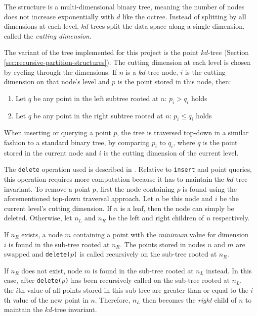The structure is a multi-dimensional binary tree, meaning the number of nodes does not increase exponentially with $d$ like the octree. Instead of splitting by all dimensions at each level, $kd$-trees split the data space along a single dimension, called the \textit{cutting dimension}.

The variant of the tree implemented for this project is the point $kd$-tree (Section \ref{sec:recursive-partition-structures}). The cutting dimension at each level is chosen by cycling through the dimensions. If $n$ is a $kd$-tree node, $i$ is the cutting dimension on that node's level and $p$ is the point stored in this node, then:
\begin{enumerate}
	\item Let $q$ be any point in the left subtree rooted at $n$: $p_i > q_i$ holds
	\item Let $q$ be any point in the right subtree rooted at $n$: $p_i \leq q_i$ holds
\end{enumerate}
When inserting or querying a point $p$, the tree is traversed top-down in a similar fashion to a standard binary tree, by comparing $p_i$ to $q_i$, where $q$ is the point stored in the current node and $i$ is the cutting dimension of the current level.

The \texttt{delete} operation used is described in \cite{kdtree-remove}. Relative to \texttt{insert} and point queries, this operation requires more computation because it has to maintain the $kd$-tree invariant. To remove a point $p$, first the node containing $p$ is found using the aforementioned top-down traversal approach. Let $n$ be this node and $i$ be the current level's cutting dimension. If $n$ is a leaf, then the node can simply be deleted. Otherwise, let $n_L$ and $n_R$ be the left and right children of $n$ respectively. 

If $n_R$ exists, a node $m$ containing a point with the \textit{minimum} value for dimension $i$ is found in the sub-tree rooted at $n_R$. The points stored in nodes $n$ and $m$ are swapped and \texttt{delete($p$)} is called recursively on the sub-tree rooted at $n_R$.

If $n_R$ does not exist, node $m$ is found in the sub-tree rooted at $n_L$ instead. In this case, after \texttt{delete($p$)} has been recursively called on the sub-tree rooted at $n_L$, the $i$th value of all points stored in this sub-tree are greater than or equal to the $i$th value of the new point in $n$. Therefore, $n_L$ then becomes the \textit{right} child of $n$ to maintain the $kd$-tree invariant. 

